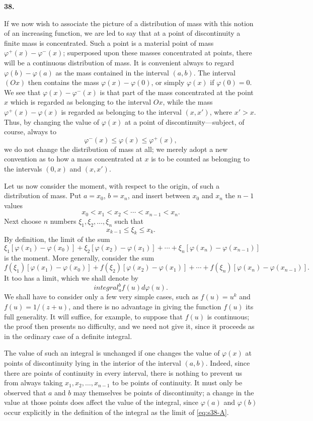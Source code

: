 \documentclass[
  paper=b5,
  fontsize=13pt,
  twoside,
  headings=normal,
  bookmarkpackage=false
]{scrartcl}
\theoremstyle{stieltjesplain}
\theoremstyle{stieltjesdefinition}
\def\int{integral}%
\def\,{ }%
\newcommand{\origsection}[1]{%
  \par\addvspace{0.85\baselineskip}%
  \phantomsection\label{sec:#1}%
  \addcontentsline{toc}{subsection}{\texorpdfstring{\S~#1}{Section #1}}%
  \noindent\textbf{#1.}\quad\ignorespaces
}
\begin{document}
\origsection{38}
If we now wish to associate the picture of a distribution of mass with this notion of an increasing function, we are led to say that at a point of discontinuity a finite mass is concentrated. Such a point is a material point of mass $\varphi^{+}(x)-\varphi^{-}(x)$; superposed upon these masses concentrated at points, there will be a continuous distribution of mass. It is convenient always to regard $\varphi(b)-\varphi(a)$ as the mass contained in the interval $(a,b)$. The interval $(Ox)$ then contains the mass $\varphi(x)-\varphi(0)$, or simply $\varphi(x)$ if $\varphi(0)=0$. We see that $\varphi(x)-\varphi^{-}(x)$ is that part of the mass concentrated at the point $x$ which is
regarded as belonging to the interval $Ox$, while the mass $\varphi^{+}(x)-\varphi(x)$ is regarded as belonging to the interval $(x,x')$, where $x'>x$. Thus, by changing the value of $\varphi(x)$ at a point of discontinuity---subject, of course, always to
\[
  \varphi^{-}(x)\leq\varphi(x)\leq\varphi^{+}(x),
\]
we do not change the distribution of mass at all; we merely adopt a new convention as to how a mass concentrated at $x$ is to be counted as belonging to the intervals $(0,x)$ and $(x,x')$.

Let us now consider the moment, with respect to the origin, of such a distribution of mass. Put $a=x_0$, $b=x_n$, and insert between $x_0$ and $x_n$ the $n-1$ values
\[
  x_0<x_1<x_2<\cdots<x_{n-1}<x_n.
\]
Next choose $n$ numbers $\xi_1,\xi_2,\ldots,\xi_n$ such that
\[
  x_{k-1}\leq\xi_k\leq x_k.
\]
By definition, the limit of the sum
\[
  \xi_1[\varphi(x_1)-\varphi(x_0)]
  +\xi_2[\varphi(x_2)-\varphi(x_1)]+\cdots
  +\xi_n[\varphi(x_n)-\varphi(x_{n-1})]
\]
is the moment. More generally, consider the sum
\begin{equation}
 f(\xi_1)[\varphi(x_1)-\varphi(x_0)]
 +f(\xi_2)[\varphi(x_2)-\varphi(x_1)]+\cdots
 +f(\xi_n)[\varphi(x_n)-\varphi(x_{n-1})].
 \tag{A}\label{eq:s38-A}
\end{equation}
It too has a limit, which we shall denote by
\[
  \int_a^b f(u)\,d\varphi(u).
\]
We shall have to consider only a few very simple cases, such as $f(u)=u^k$ and $f(u)=1/(z+u)$, and there is no advantage in giving the function $f(u)$ its full generality. It will suffice, for example, to suppose that $f(u)$ is continuous; the proof then presents no difficulty, and we need not give it, since it proceeds as in the ordinary case of a definite integral.

The value of such an integral is unchanged if one changes the value of $\varphi(x)$ at points of discontinuity lying in the interior of the interval $(a,b)$. Indeed, since there are points of continuity in every interval, there is nothing to prevent us from always taking $x_1,x_2,\ldots,x_{n-1}$ to be
points of continuity. It must only be observed that $a$ and $b$ may themselves be points of discontinuity; a change in the value at those points does affect the value of the integral, since $\varphi(a)$ and $\varphi(b)$ occur explicitly in the definition of the integral as the limit of \eqref{eq:s38-A}.
\end{document}
